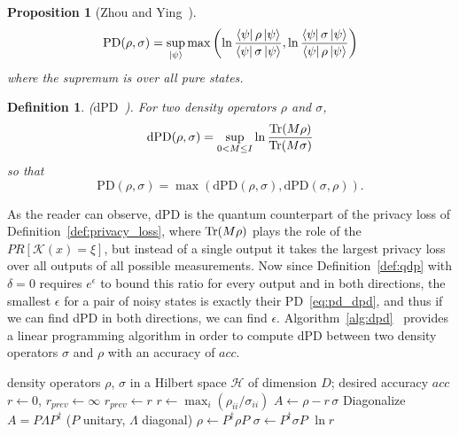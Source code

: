 \documentclass{ieeeaccess}
\newtheorem{definition}{Definition}[section]
\newtheorem{proposition}{Proposition}[section]
\begin{document}
\begin{proposition}[Zhou and Ying~\cite{zhou2017differential}]
  \[
    \mathrm{PD}(\rho, \sigma) = \sup_{\ket{\psi}} \max\left(\ln\frac{\bra{\psi}\rho\ket{\psi}}{\bra{\psi}\sigma\ket{\psi}}, \ln\frac{\bra{\psi}\sigma\ket{\psi}}{\bra{\psi}\rho\ket{\psi}}\right)
  \]
  where the supremum is over all pure states.
  \label{prop:pd_pure_states}
\end{proposition}

\begin{definition}
  ($\mathrm{dPD}$~\cite{zhou2017differential}). For two density operators $\rho$ and $\sigma$,
  \[
    \mathrm{dPD}(\rho, \sigma) = \sup_{0 < M \leq I} \ln\frac{\Tr(M\rho)}{\Tr(M\sigma)}
  \]
  so that
  \begin{equation}
    \mathrm{PD}(\rho, \sigma) = \max\left(\mathrm{dPD}(\rho, \sigma), \mathrm{dPD}(\sigma, \rho)\right).
    \label{eq:pd_dpd}
  \end{equation}
  \label{def:dpd}
\end{definition}

As the reader can observe, dPD is the quantum counterpart of the privacy loss of Definition~\ref{def:privacy_loss}, where $\Tr(M\rho)$ plays the role of the $PR[\mathcal{K}(x) = \xi]$, but instead of a single output it takes the largest privacy loss over all outputs of all possible measurements. Now since Definition~\ref{def:qdp} with $\delta = 0$ requires $e^{\epsilon}$ to bound this ratio for every output and in both directions, the smallest $\epsilon$ for a pair of noisy states is exactly their PD~\eqref{eq:pd_dpd}, and thus if we can find dPD in both directions, we can find $\epsilon$. Algorithm~\ref{alg:dpd}~\cite{zhou2017differential} provides a linear programming algorithm in order to compute dPD between two density operators $\sigma$ and $\rho$ with an accuracy of $\mathit{acc}$.

\begin{algorithm}[!t]
  \caption{Computing $\mathrm{dPD}$ \cite{zhou2017differential}}
  \label{alg:dpd}
  \begin{algorithmic}[1]
    \REQUIRE density operators $\rho$, $\sigma$ in a Hilbert space $\mathcal{H}$ of dimension $D$; desired accuracy $\mathit{acc}$
    \STATE $r \gets 0$, $r_{prev} \gets \infty$
    \STATE $r_{prev} \gets r$
    \STATE $r \gets \max_i (\rho_{ii}/\sigma_{ii})$
    \STATE $A \gets \rho - r\,\sigma$
    \STATE Diagonalize $A = P \Lambda P^{\dagger}$ ($P$ unitary, $\Lambda$ diagonal)
    \STATE $\rho \gets P^{\dagger} \rho P$
    \STATE $\sigma \gets P^{\dagger} \sigma P$
    \ENDWHILE
    \RETURN $\ln r$
  \end{algorithmic}
\end{algorithm}
\end{document}
